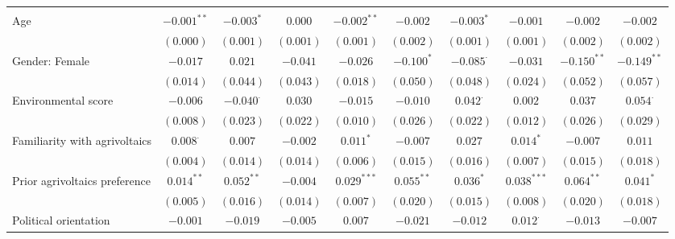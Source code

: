 \begin{center}
\begin{small}
\begin{longtable}{l@{} c@{} c@{} c@{} c@{} c@{} c@{} c@{} c@{} c@{}}
                                    &                 &                  &             &                &              &                  &                 &                 &                 \\
\quad Age                           & $-0.001^{**}$   & $-0.003^{*}$     & $0.000$     & $-0.002^{**}$  & $-0.002$     & $-0.003^{*}$     & $-0.001$        & $-0.002$        & $-0.002$        \\
                                    & $(0.000)$       & $(0.001)$        & $(0.001)$   & $(0.001)$      & $(0.002)$    & $(0.001)$        & $(0.001)$       & $(0.002)$       & $(0.002)$       \\
\quad Gender: Female                & $-0.017$        & $0.021$          & $-0.041$    & $-0.026$       & $-0.100^{*}$ & $-0.085^{\cdot}$ & $-0.031$        & $-0.150^{**}$   & $-0.149^{**}$   \\
                                    & $(0.014)$       & $(0.044)$        & $(0.043)$   & $(0.018)$      & $(0.050)$    & $(0.048)$        & $(0.024)$       & $(0.052)$       & $(0.057)$       \\
\quad Environmental score           & $-0.006$        & $-0.040^{\cdot}$ & $0.030$     & $-0.015$       & $-0.010$     & $0.042^{\cdot}$  & $0.002$         & $0.037$         & $0.054^{\cdot}$ \\
                                    & $(0.008)$       & $(0.023)$        & $(0.022)$   & $(0.010)$      & $(0.026)$    & $(0.022)$        & $(0.012)$       & $(0.026)$       & $(0.029)$       \\
\quad Familiarity with agrivoltaics & $0.008^{\cdot}$ & $0.007$          & $-0.002$    & $0.011^{*}$    & $-0.007$     & $0.027$          & $0.014^{*}$     & $-0.007$        & $0.011$         \\
                                    & $(0.004)$       & $(0.014)$        & $(0.014)$   & $(0.006)$      & $(0.015)$    & $(0.016)$        & $(0.007)$       & $(0.015)$       & $(0.018)$       \\
\quad Prior agrivoltaics preference & $0.014^{**}$    & $0.052^{**}$     & $-0.004$    & $0.029^{***}$  & $0.055^{**}$ & $0.036^{*}$      & $0.038^{***}$   & $0.064^{**}$    & $0.041^{*}$     \\
                                    & $(0.005)$       & $(0.016)$        & $(0.014)$   & $(0.007)$      & $(0.020)$    & $(0.015)$        & $(0.008)$       & $(0.020)$       & $(0.018)$       \\
\quad Political orientation         & $-0.001$        & $-0.019$         & $-0.005$    & $0.007$        & $-0.021$     & $-0.012$         & $0.012^{\cdot}$ & $-0.013$        & $-0.007$        \\

\end{longtable}
\end{small}
\end{center}
